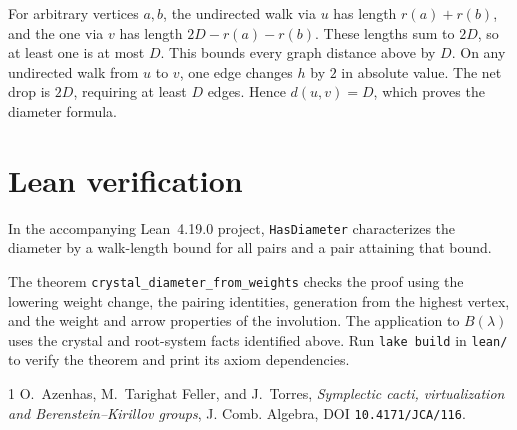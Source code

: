 \documentclass[11pt]{article}
\begin{document}
For arbitrary vertices \(a,b\), the undirected walk via \(u\) has
length \(r(a)+r(b)\), and the one via \(v\) has length
\(2D-r(a)-r(b)\). These lengths sum to \(2D\), so at least one
is at most \(D\). This bounds every graph distance above by \(D\).
On any undirected walk from \(u\) to \(v\), one edge changes \(h\)
by \(2\) in absolute value. The net drop is \(2D\), requiring at least
\(D\) edges. Hence \(d(u,v)=D\), which proves the diameter formula.

\section*{Lean verification}

In the accompanying Lean~4.19.0 project, \verb|HasDiameter| characterizes the
diameter by a walk-length bound for all pairs and a pair attaining that bound.

The theorem \verb|crystal_diameter_from_weights| checks the proof using the
lowering weight change, the pairing identities, generation from the highest
vertex, and the weight and arrow properties of the involution. The
application to \(B(\lambda)\) uses the crystal and root-system facts
identified above. Run \verb|lake build| in \verb|lean/| to verify the theorem
and print its axiom dependencies.

\begin{thebibliography}{1}
O.~Azenhas, M.~Tarighat Feller, and J.~Torres,
\emph{Symplectic cacti, virtualization and Berenstein--Kirillov groups},
J. Comb. Algebra, DOI \texttt{10.4171/JCA/116}.
\end{thebibliography}
\end{document}
